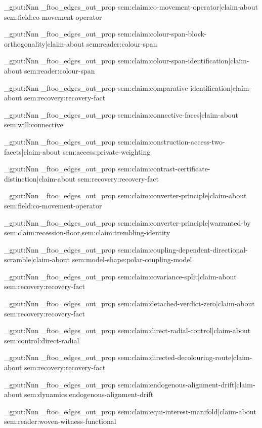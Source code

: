 \prop_gput:Nnn \g_ftoo_edges_out_prop { sem:claim:co-movement-operator|claim-about } { sem:field:co-movement-operator }

\prop_gput:Nnn \g_ftoo_edges_out_prop { sem:claim:colour-span-block-orthogonality|claim-about } { sem:reader:colour-span }

\prop_gput:Nnn \g_ftoo_edges_out_prop { sem:claim:colour-span-identification|claim-about } { sem:reader:colour-span }

\prop_gput:Nnn \g_ftoo_edges_out_prop { sem:claim:comparative-identification|claim-about } { sem:recovery:recovery-fact }

\prop_gput:Nnn \g_ftoo_edges_out_prop { sem:claim:connective-faces|claim-about } { sem:will:connective }

\prop_gput:Nnn \g_ftoo_edges_out_prop { sem:claim:construction-access-two-facets|claim-about } { sem:access:private-weighting }

\prop_gput:Nnn \g_ftoo_edges_out_prop { sem:claim:contrast-certificate-distinction|claim-about } { sem:recovery:recovery-fact }

\prop_gput:Nnn \g_ftoo_edges_out_prop { sem:claim:converter-principle|claim-about } { sem:field:co-movement-operator }

\prop_gput:Nnn \g_ftoo_edges_out_prop { sem:claim:converter-principle|warranted-by } { sem:claim:recession-floor,sem:claim:trembling-identity }

\prop_gput:Nnn \g_ftoo_edges_out_prop { sem:claim:coupling-dependent-directional-scramble|claim-about } { sem:model-shape:polar-coupling-model }

\prop_gput:Nnn \g_ftoo_edges_out_prop { sem:claim:covariance-split|claim-about } { sem:recovery:recovery-fact }

\prop_gput:Nnn \g_ftoo_edges_out_prop { sem:claim:detached-verdict-zero|claim-about } { sem:recovery:recovery-fact }

\prop_gput:Nnn \g_ftoo_edges_out_prop { sem:claim:direct-radial-control|claim-about } { sem:control:direct-radial }

\prop_gput:Nnn \g_ftoo_edges_out_prop { sem:claim:directed-decolouring-route|claim-about } { sem:recovery:recovery-fact }

\prop_gput:Nnn \g_ftoo_edges_out_prop { sem:claim:endogenous-alignment-drift|claim-about } { sem:dynamics:endogenous-alignment-drift }

\prop_gput:Nnn \g_ftoo_edges_out_prop { sem:claim:equi-interest-manifold|claim-about } { sem:reader:woven-witness-functional }

